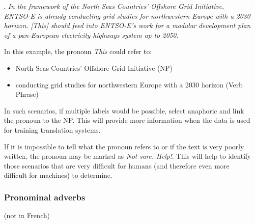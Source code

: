 \documentclass[a4paper]{article}
\begin{document}
{{\ex.
{\sl In the framework of the North Seas Countries’ Offshore Grid Initiative, ENTSO-E is already conducting grid studies for northwestern Europe with a 2030 horizon. [This] should feed into ENTSO-E's work for a modular development plan of a pan-European electricity highways system up to 2050.}

In this example, the pronoun {\sl This} could refer to:
\begin{itemize}
\item North Seas Countries’ Offshore Grid Initiative (NP)
\item conducting grid studies for northwestern Europe with a 2030 horizon (Verb
Phrase)
\end{itemize}

In such scenarios, if multiple labels would be possible, select anaphoric and link the pronoun to the NP. This will provide more information when the data is used for training translation systems.

If it is impossible to tell what the pronoun refers to or if the text is very poorly written, the pronoun may be marked as {\sl Not sure. Help!}. This will help to identify those scenarios that are very difficult for humans (and therefore even more difficult for machines) to determine.

\subsubsection{Pronominal adverbs}\label{sec:pronadv}

(not in French)

% 
% 
% 
% 
% 
% 

}}
\end{document}
